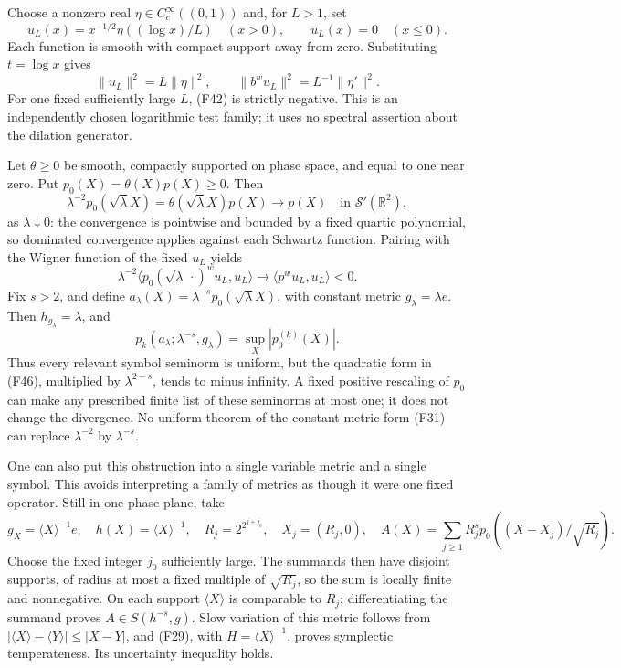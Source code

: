 \documentclass[
  11pt,
]{article}
\begin{document}
Choose a nonzero real \(\eta\in C_c^\infty((0,1))\) and, for \(L>1\),
set \[
u_L(x)=x^{-1/2}\eta((\log x)/L)\quad(x>0),
\qquad u_L(x)=0\quad(x\leq0).
\tag{F43}
\] Each function is smooth with compact support away from zero.
Substituting \(t=\log x\) gives \[
\|u_L\|^2=L\|\eta\|^2,
\qquad \|b^wu_L\|^2=L^{-1}\|\eta'\|^2.
\tag{F44}
\] For one fixed sufficiently large \(L\), (F42) is strictly negative.
This is an independently chosen logarithmic test family; it uses no
spectral assertion about the dilation generator.

Let \(\theta\geq0\) be smooth, compactly supported on phase space, and
equal to one near zero. Put \(p_0(X)=\theta(X)p(X)\geq0\). Then \[
\lambda^{-2}p_0(\sqrt\lambda X)
=\theta(\sqrt\lambda X)p(X)\longrightarrow p(X)
\quad\text{in }\mathcal S'(\mathbb R^2),
\tag{F45}
\] as \(\lambda\downarrow0\): the convergence is pointwise and bounded
by a fixed quartic polynomial, so dominated convergence applies against
each Schwartz function. Pairing with the Wigner function of the fixed
\(u_L\) yields \[
\lambda^{-2}\langle p_0(\sqrt\lambda\,\cdot)^wu_L,u_L\rangle
\longrightarrow\langle p^wu_L,u_L\rangle<0.
\tag{F46}
\] Fix \(s>2\), and define
\(a_\lambda(X)=\lambda^{-s}p_0(\sqrt\lambda X)\), with constant metric
\(g_\lambda=\lambda e\). Then \(h_{g_\lambda}=\lambda\), and \[
p_k(a_\lambda;\lambda^{-s},g_\lambda)
=\sup_X|p_0^{(k)}(X)|.
\tag{F47}
\] Thus every relevant symbol seminorm is uniform, but the quadratic
form in (F46), multiplied by \(\lambda^{2-s}\), tends to minus infinity.
A fixed positive rescaling of \(p_0\) can make any prescribed finite
list of these seminorms at most one; it does not change the divergence.
No uniform theorem of the constant-metric form (F31) can replace
\(\lambda^{-2}\) by \(\lambda^{-s}\).

One can also put this obstruction into a single variable metric and a
single symbol. This avoids interpreting a family of metrics as though it
were one fixed operator. Still in one phase plane, take \[
g_X=\langle X\rangle^{-1}e,\quad h(X)=\langle X\rangle^{-1},
\quad R_j=2^{2^{j+j_0}},\quad X_j=(R_j,0),
\quad A(X)=\sum_{j\geq1}R_j^s p_0((X-X_j)/\sqrt{R_j}).
\tag{F48}
\] Choose the fixed integer \(j_0\) sufficiently large. The summands
then have disjoint supports, of radius at most a fixed multiple of
\(\sqrt{R_j}\), so the sum is locally finite and nonnegative. On each
support \(\langle X\rangle\) is comparable to \(R_j\); differentiating
the summand proves \(A\in S(h^{-s},g)\). Slow variation of this metric
follows from \(|\langle X\rangle-\langle Y\rangle|\leq|X-Y|\), and
(F29), with \(H=\langle X\rangle^{-1}\), proves symplectic
temperateness. Its uncertainty inequality holds.
\end{document}
